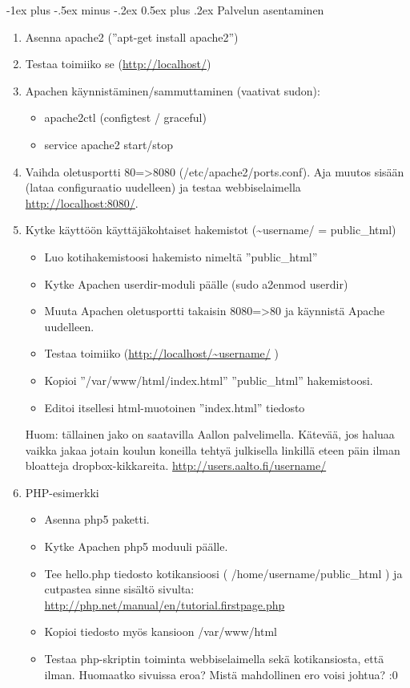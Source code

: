 \documentclass[12pt,portrait,a4]{article}
\makeatletter
\renewcommand{\section}{\@startsection{section}{1}{0mm}%
                                {-1ex plus -.5ex minus -.2ex}%
                                {0.5ex plus .2ex}%
                                {\normalfont\large\bfseries}}
\makeatother
\begin{document}
\section{Palvelun asentaminen}

\begin{enumerate}
\item Asenna apache2 (''apt-get install apache2'')
\item Testaa toimiiko se (\url{http://localhost/})
\item Apachen käynnistäminen/sammuttaminen (vaativat sudon):
	\begin{itemize}
	\item apache2ctl (configtest / graceful)
	\item service apache2 start/stop
	\end{itemize}
\item Vaihda oletusportti 80=\textgreater 8080 (/etc/apache2/ports.conf).  Aja muutos sisään (lataa configuraatio uudelleen) ja testaa webbiselaimella \url{http://localhost:8080/}.
\item Kytke käyttöön käyttäjäkohtaiset hakemistot (\textasciitilde username/ = public\_html)
	\begin{itemize}
	\item Luo kotihakemistoosi hakemisto nimeltä ''public\_html''
	\item Kytke Apachen userdir-moduli päälle (sudo a2enmod userdir)
	\item Muuta Apachen oletusportti takaisin 8080=\textgreater 80 ja käynnistä Apache uudelleen.
	\item Testaa toimiiko (\url{http://localhost/~username/} )
	\item Kopioi ''/var/www/html/index.html'' ''public\_html'' hakemistoosi.
	\item Editoi itsellesi html-muotoinen ''index.html'' tiedosto
	\end{itemize}

Huom: tällainen jako on saatavilla Aallon palvelimella. Kätevää, jos haluaa vaikka jakaa jotain koulun koneilla tehtyä julkisella linkillä eteen päin ilman bloatteja dropbox-kikkareita.
\url{http://users.aalto.fi/username/}


\item PHP-esimerkki
	\begin{itemize}
	\item Asenna php5 paketti.
	\item Kytke Apachen php5 moduuli päälle.
	\item Tee hello.php tiedosto kotikansioosi ( /home/username/public\_html ) ja cutpastea sinne sisältö sivulta:
\url{http://php.net/manual/en/tutorial.firstpage.php}
	\item Kopioi tiedosto myös kansioon /var/www/html
	\item Testaa php-skriptin toiminta webbiselaimella sekä kotikansiosta, että ilman. Huomaatko sivuissa eroa? Mistä mahdollinen ero voisi johtua? :0
	\end{itemize}
\end{enumerate}
\end{document}
